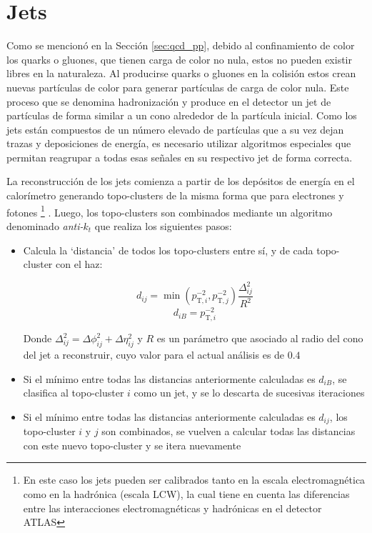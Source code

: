 \section{Jets}

Como se mencionó en la Sección \ref{sec:qcd_pp}, debido al confinamiento de color los quarks o gluones, que tienen carga de color no nula, estos no pueden existir libres en la naturaleza. Al producirse quarks o gluones en la colisión estos crean nuevas partículas de color para generar partículas de carga de color nula. Este proceso que se denomina hadronización y produce en el detector un jet de partículas de forma similar a un cono alrededor de la partícula inicial. Como los jets están compuestos de un número elevado de partículas que a su vez dejan trazas y deposiciones de energía, es necesario utilizar algoritmos especiales que permitan reagrupar a todas esas señales en su respectivo jet de forma correcta.

La reconstrucción de los jets comienza a partir de los depósitos de energía en el calorímetro generando topo-clusters de la misma forma que para electrones y fotones \footnote{En este caso los jets pueden ser calibrados tanto en la escala electromagnética como en la hadrónica (escala LCW), la cual tiene en cuenta las diferencias entre las interacciones electromagnéticas y hadrónicas en el detector ATLAS} \cite{Lampl:1099735}. Luego, los topo-clusters son combinados mediante un algoritmo denominado \textit{anti-$k_t$} \cite{Cacciari:2008gp} que realiza los siguientes pasos:

\begin{itemize}
	\item Calcula la `distancia' de todos los topo-clusters entre sí, y de cada topo-cluster con el haz:

	\begin{equation}
		d_{ij} = \min(p_{\text{T},i}^{-2}, p_{\text{T},j}^{-2})\frac{\Delta_{ij}^{2}}{R^{2}}
	\end{equation}
	\begin{equation}
		d_{iB} = p_{\text{T},i}^{-2}
	\end{equation}

	Donde $\Delta_{ij}^{2} = \Delta\phi_{ij}^{2} + \Delta\eta_{ij}^{2}$ y $R$ es un parámetro que asociado al radio del cono del jet a reconstruir, cuyo valor para el actual análisis es de $0.4$

	\item Si el mínimo entre todas las distancias anteriormente calculadas es $d_{iB}$, se clasifica al topo-cluster $i$ como un jet, y se lo descarta de sucesivas iteraciones

	\item Si el mínimo entre todas las distancias anteriormente calculadas es $d_{ij}$, los topo-cluster $i$ y $j$ son combinados, se vuelven a calcular todas las distancias con este nuevo topo-cluster y se itera nuevamente 

\end{itemize}

